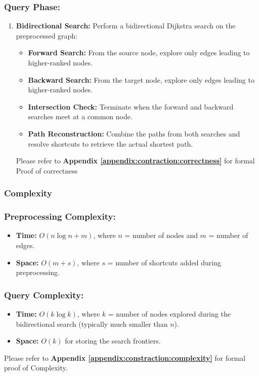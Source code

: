 	\subsubsection*{Query Phase:}
	\begin{enumerate}
		\item \textbf{Bidirectional Search:} Perform a bidirectional Dijkstra search on the preprocessed graph:
		\begin{itemize}
			\item \textbf{Forward Search:} From the source node, explore only edges leading to higher-ranked nodes.
			\item \textbf{Backward Search:} From the target node, explore only edges leading to higher-ranked nodes.
			\item \textbf{Intersection Check:} Terminate when the forward and backward searches meet at a common node.
			\item \textbf{Path Reconstruction:} Combine the paths from both searches and resolve shortcuts to retrieve the actual shortest path.
		\end{itemize}
	Please refer to \textbf{Appendix \ref{appendix:contraction:correctness}} for formal Proof of correctness
	\end{enumerate}
	\subsubsection{Complexity}
	\subsubsection*{Preprocessing Complexity:}
	\begin{itemize}
		\item \textbf{Time:} \(O(n \log n + m)\), where \(n\) = number of nodes and \(m\) = number of edges.
		\item \textbf{Space:} \(O(m+s)\), where \(s\) = number of shortcuts added during preprocessing.
	\end{itemize}
	
	\subsubsection*{Query Complexity:}
	\begin{itemize}
		\item \textbf{Time:} \(O(k \log k)\), where \(k\) = number of nodes explored during the bidirectional search (typically much smaller than \(n\)).
		\item \textbf{Space:} \(O(k)\) for storing the search frontiers.
	\end{itemize}
	Please refer to \textbf{Appendix \ref{appendix:constraction:complexity}} for formal proof of Complexity.

